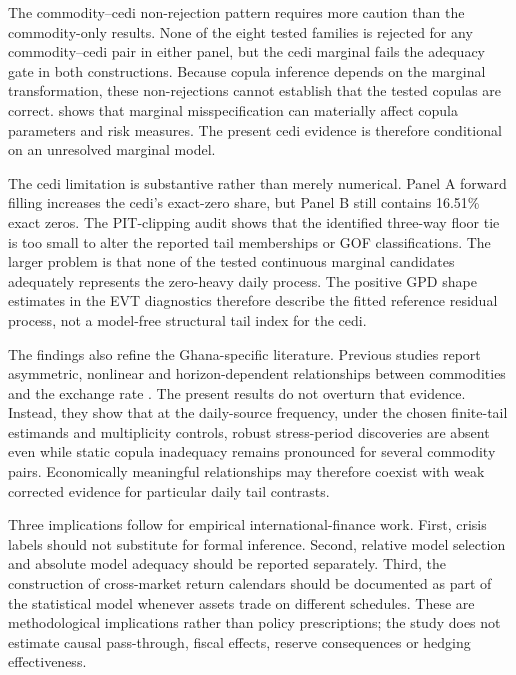 The commodity--cedi non-rejection pattern requires more caution than the commodity-only results. None of the eight tested families is rejected for any commodity--cedi pair in either panel, but the cedi marginal fails the adequacy gate in both constructions. Because copula inference depends on the marginal transformation, these non-rejections cannot establish that the tested copulas are correct. \citet{fantazzini2009} shows that marginal misspecification can materially affect copula parameters and risk measures. The present cedi evidence is therefore conditional on an unresolved marginal model.

The cedi limitation is substantive rather than merely numerical. Panel A forward filling increases the cedi's exact-zero share, but Panel B still contains 16.51\% exact zeros. The PIT-clipping audit shows that the identified three-way floor tie is too small to alter the reported tail memberships or GOF classifications. The larger problem is that none of the tested continuous marginal candidates adequately represents the zero-heavy daily process. The positive GPD shape estimates in the EVT diagnostics therefore describe the fitted reference residual process, not a model-free structural tail index for the cedi.

The findings also refine the Ghana-specific literature. Previous studies report asymmetric, nonlinear and horizon-dependent relationships between commodities and the exchange rate \citep{archer2022,barson2023,yeboah2025,atipaga2025,woode2025}. The present results do not overturn that evidence. Instead, they show that at the daily-source frequency, under the chosen finite-tail estimands and multiplicity controls, robust stress-period discoveries are absent even while static copula inadequacy remains pronounced for several commodity pairs. Economically meaningful relationships may therefore coexist with weak corrected evidence for particular daily tail contrasts.

Three implications follow for empirical international-finance work. First, crisis labels should not substitute for formal inference. Second, relative model selection and absolute model adequacy should be reported separately. Third, the construction of cross-market return calendars should be documented as part of the statistical model whenever assets trade on different schedules. These are methodological implications rather than policy prescriptions; the study does not estimate causal pass-through, fiscal effects, reserve consequences or hedging effectiveness.

